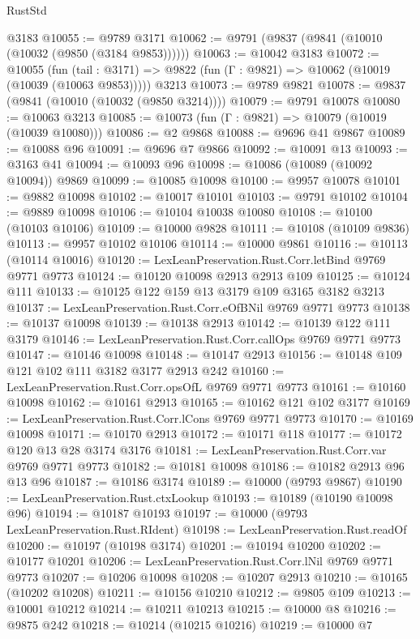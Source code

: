\begin{lexlean}{RustStd}
\begin{coremodule}
    @3183
@10055 := @9789 @3171
@10062 := @9791 (@9837 (@9841 (@10010 (@10032 (@9850 (@3184 @9853))))))
@10063 := @10042 @3183
@10072 := @10055
    (fun (tail : @3171) => @9822 (fun (Γ : @9821) => @10062 (@10019 (@10039 (@10063 @9853)))))
    @3213
@10073 := @9789 @9821
@10078 := @9837 (@9841 (@10010 (@10032 (@9850 @3214))))
@10079 := @9791 @10078
@10080 := @10063 @3213
@10085 := @10073 (fun (Γ : @9821) => @10079 (@10019 (@10039 @10080)))
@10086 := @2 @9868
@10088 := @9696 @41 @9867
@10089 := @10088 @96
@10091 := @9696 @7 @9866
@10092 := @10091 @13
@10093 := @3163 @41
@10094 := @10093 @96
@10098 := @10086 (@10089 (@10092 @10094)) @9869
@10099 := @10085 @10098
@10100 := @9957 @10078
@10101 := @9882 @10098
@10102 := @10017 @10101
@10103 := @9791 @10102
@10104 := @9889 @10098
@10106 := @10104 @10038 @10080
@10108 := @10100 (@10103 @10106)
@10109 := @10000 @9828
@10111 := @10108 (@10109 @9836)
@10113 := @9957 @10102 @10106
@10114 := @10000 @9861
@10116 := @10113 (@10114 @10016)
@10120 := LexLeanPreservation.Rust.Corr.letBind @9769 @9771 @9773
@10124 := @10120 @10098 @2913 @2913 @109
@10125 := @10124 @111
@10133 := @10125 @122 @159 @13 @3179 @109 @3165 @3182 @3213
@10137 := LexLeanPreservation.Rust.Corr.eOfBNil @9769 @9771 @9773
@10138 := @10137 @10098
@10139 := @10138 @2913
@10142 := @10139 @122 @111 @3179
@10146 := LexLeanPreservation.Rust.Corr.callOps @9769 @9771 @9773
@10147 := @10146 @10098
@10148 := @10147 @2913
@10156 := @10148 @109 @121 @102 @111 @3182 @3177 @2913 @242
@10160 := LexLeanPreservation.Rust.Corr.opsOfL @9769 @9771 @9773
@10161 := @10160 @10098
@10162 := @10161 @2913
@10165 := @10162 @121 @102 @3177
@10169 := LexLeanPreservation.Rust.Corr.lCons @9769 @9771 @9773
@10170 := @10169 @10098
@10171 := @10170 @2913
@10172 := @10171 @118
@10177 := @10172 @120 @13 @28 @3174 @3176
@10181 := LexLeanPreservation.Rust.Corr.var @9769 @9771 @9773
@10182 := @10181 @10098
@10186 := @10182 @2913 @96 @13 @96
@10187 := @10186 @3174
@10189 := @10000 (@9793 @9867)
@10190 := LexLeanPreservation.Rust.ctxLookup
@10193 := @10189 (@10190 @10098 @96)
@10194 := @10187 @10193
@10197 := @10000 (@9793 LexLeanPreservation.Rust.RIdent)
@10198 := LexLeanPreservation.Rust.readOf
@10200 := @10197 (@10198 @3174)
@10201 := @10194 @10200
@10202 := @10177 @10201
@10206 := LexLeanPreservation.Rust.Corr.lNil @9769 @9771 @9773
@10207 := @10206 @10098
@10208 := @10207 @2913
@10210 := @10165 (@10202 @10208)
@10211 := @10156 @10210
@10212 := @9805 @109
@10213 := @10001 @10212
@10214 := @10211 @10213
@10215 := @10000 @8
@10216 := @9875 @242
@10218 := @10214 (@10215 @10216)
@10219 := @10000 @7

\end{coremodule}
\end{lexlean}
